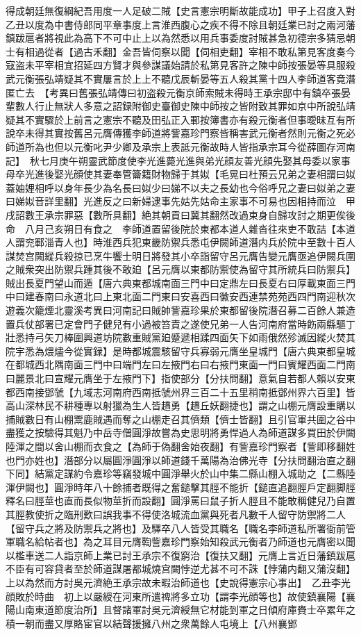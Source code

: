 得成朝廷無復綱紀吾用度一人足破二賊【史言憲宗明斷故能成功】甲子上召度入對乙丑以度為中書侍郎同平章事度上言淮西腹心之疾不得不除且朝廷業已討之兩河藩鎮跋扈者將視此為高下不可中止上以為然悉以用兵事委度討賊甚急初德宗多猜忌朝士有相過從者【過古禾翻】金吾皆伺察以聞【伺相吏翻】宰相不敢私第見客度奏今寇盗未平宰相宜招延四方賢才與參謀議始請於私第見客許之陳中師按張晏等具服殺武元衡張弘靖疑其不實屢言於上上不聽戊辰斬晏等五人殺其黨十四人李師道客竟潛匿亡去　【考異曰舊張弘靖傳曰初盗殺元衡京師索賊未得時王承宗邸中有鎮卒張晏輩數人行止無狀人多意之詔録附御史臺御史陳中師按之皆附致其罪如京中所說弘靖疑其不實驟於上前言之憲宗不聽及田弘正入鄆按簿書亦有殺元衡者但事曖昧互有所說卒未得其實按舊呂元膺傳獲李師道將訾嘉珍門察皆稱害武元衡者然則元衡之死必師道所為也但以元衡叱尹少卿及承宗上表詆元衡故時人皆指承宗耳今從薛圖存河南記】　秋七月庚午朔靈武節度使李光進薨光進與弟光顔友善光顔先娶其母委以家事母卒光進後娶光顔使其妻奉管籥籍財物歸于其姒【毛晃曰杜預云兄弟之妻相謂曰姒蓋妯娌相呼以身年長少為名長曰姒少曰娣不以夫之長幼也今俗呼兄之妻曰姒弟之妻曰娣姒音詳里翻】光進反之曰新婦逮事先姑先姑命主家事不可易也因相持而泣　甲戌詔數王承宗罪惡【數所具翻】絶其朝貢曰冀其翻然改過束身自歸攻討之期更俟後命　八月己亥朔日有食之　李師道置留後院於東都本道人雜沓往來吏不敢詰【本道人謂兖鄆淄青人也】時淮西兵犯東畿防禦兵悉屯伊闕師道潛内兵於院中至數十百人謀焚宫闕縱兵殺掠已烹牛饗士明日將發其小卒詣留守呂元膺告變元膺亟追伊闕兵圍之賊衆突出防禦兵踵其後不敢廹【呂元膺以東都防禦使為留守其所統兵曰防禦兵】賊出長夏門望山而遁【唐六典東都城南面三門中曰定鼎左曰長夏右曰厚載東面三門中曰建春南曰永道北曰上東北面二門東曰安喜西曰徽安西連禁苑苑西四門南迎秋次遊義次籠煙北靈溪考異曰河南記曰賊帥訾嘉珍果於東都留後院潛召募二百餘人兼造置兵仗部署已定會門子健兒有小過被笞責之遂使兄弟一人告河南府當時飭兩縣驅丁壯悉持弓矢刀棒圍興道坊院數重賊黨廹蹙遞相蹂四面矢下如雨俄然殄滅因縱火焚其院宇悉為煨燼今從實録】是時都城震駭留守兵寡弱元膺坐皇城門【唐六典東都皇城在都城西北隅南面三門中曰端門左曰左掖門右曰右掖門東面一門曰賓耀西面二門南曰麗景北曰宣耀元膺坐于左掖門下】指使部分【分扶問翻】意氣自若都人賴以安東都西南接鄧虢【九域志河南府西南抵虢州界三百二十五里稍南抵鄧州界六百里】皆高山深林民不耕種專以射獵為生人皆趫勇【趫丘妖翻捷也】謂之山棚元膺設重購以捕賊數日有山棚鬻鹿賊遇而奪之山棚走召其儕類【儕士皆翻】且引官軍共圍之谷中盡獲之按驗得其魁乃中岳寺僧圓淨故嘗為史思明將勇悍過人為師道謀多買田於伊闕陸渾之間以舍山棚而衣食之【為師于偽翻舍始夜翻】有訾嘉珍門察者【訾即移翻姓也門亦姓也】潛部分以屬圓淨圓淨以師道錢千萬陽為治佛光寺【分扶問翻治直之翻下同】結黨定謀約令嘉珍等竊發城中圓淨舉火於山中集二縣山棚入城助之【二縣陸渾伊闕也】圓淨時年八十餘捕者既得之奮鎚擊其脛不能折【鎚直追翻脛戶定翻脚脛釋名曰脛莖也直而長似物莖折而設翻】圓淨罵曰鼠子折人脛且不能敢稱健兒乃自置其脛教使折之臨刑歎曰誤我事不得使洛城流血黨與死者凡數千人留守防禦將二人【留守兵之將及防禦兵之將也】及驛卒八人皆受其職名【職名李師道私所署衙前管軍職名給帖者也】為之耳目元膺鞫訾嘉珍門察始知殺武元衡者乃師道也元膺密以聞以檻車送二人詣京師上業已討王承宗不復窮治【復扶又翻】元膺上言近日藩鎮跋扈不臣有可容貸者至於師道謀屠都城燒宫闕悖逆尤甚不可不誅【悖蒲内翻又蒲沒翻】上以為然而方討吳元濟絶王承宗故未暇治師道也【史說得憲宗心事出】　乙丑李光顔敗於時曲　初上以嚴綬在河東所遣禆將多立功【謂李光顔等也】故使鎮襄陽【襄陽山南東道節度治所】且督諸軍討吳元濟綬無它材能到軍之日傾府庫賚士卒累年之積一朝而盡又厚賂宦官以結聲援擁八州之衆萬餘人屯境上【八州襄鄧